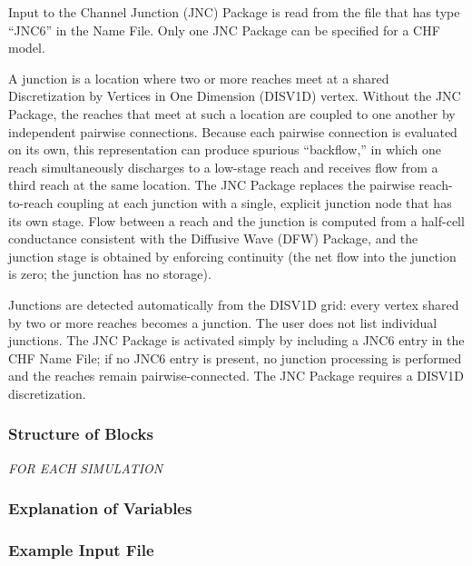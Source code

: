 Input to the Channel Junction (JNC) Package is read from the file that has type ``JNC6'' in the Name File.  Only one JNC Package can be specified for a CHF model.

A junction is a location where two or more reaches meet at a shared Discretization by Vertices in One Dimension (DISV1D) vertex.  Without the JNC Package, the reaches that meet at such a location are coupled to one another by independent pairwise connections.  Because each pairwise connection is evaluated on its own, this representation can produce spurious ``backflow,'' in which one reach simultaneously discharges to a low-stage reach and receives flow from a third reach at the same location.  The JNC Package replaces the pairwise reach-to-reach coupling at each junction with a single, explicit junction node that has its own stage.  Flow between a reach and the junction is computed from a half-cell conductance consistent with the Diffusive Wave (DFW) Package, and the junction stage is obtained by enforcing continuity (the net flow into the junction is zero; the junction has no storage).

Junctions are detected automatically from the DISV1D grid: every vertex shared by two or more reaches becomes a junction.  The user does not list individual junctions.  The JNC Package is activated simply by including a JNC6 entry in the CHF Name File; if no JNC6 entry is present, no junction processing is performed and the reaches remain pairwise-connected.  The JNC Package requires a DISV1D discretization.

\vspace{5mm}
\subsubsection{Structure of Blocks}
\vspace{5mm}

\noindent \textit{FOR EACH SIMULATION}


\vspace{5mm}
\subsubsection{Explanation of Variables}
\begin{description}

\end{description}

\vspace{5mm}
\subsubsection{Example Input File}

